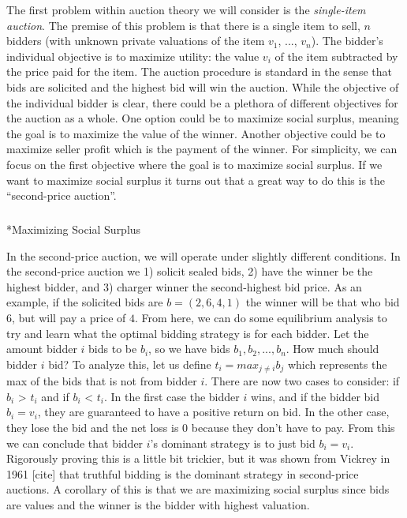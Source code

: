 \documentclass[
  letterpaper,
  numbers=noenddot,
  DIV=11]{scrreprt}
\makeatletter
\let\oldsubparagraph\subparagraph
\renewcommand{\subparagraph}{
    \@ifstar
      \xxxSubParagraphStar
      \xxxSubParagraphNoStar
  }
\newcommand{\xxxSubParagraphStar}[1]{\oldsubparagraph*{#1}\mbox{}}
\newcommand{\xxxSubParagraphNoStar}[1]{\oldsubparagraph{#1}\mbox{}}
\theoremstyle{plain}
\theoremstyle{definition}
\theoremstyle{plain}
\theoremstyle{remark}
\makeatother
\begin{document}
The first problem within auction theory we will consider is the
\emph{single-item auction}. The premise of this problem is that there is
a single item to sell, \(n\) bidders (with unknown private valuations of
the item \(v_1\), ..., \(v_n\)). The bidder's individual objective is to
maximize utility: the value \(v_i\) of the item subtracted by the price
paid for the item. The auction procedure is standard in the sense that
bids are solicited and the highest bid will win the auction. While the
objective of the individual bidder is clear, there could be a plethora
of different objectives for the auction as a whole. One option could be
to maximize social surplus, meaning the goal is to maximize the value of
the winner. Another objective could be to maximize seller profit which
is the payment of the winner. For simplicity, we can focus on the first
objective where the goal is to maximize social surplus. If we want to
maximize social surplus it turns out that a great way to do this is the
``second-price auction''.

\subparagraph*{Maximizing Social
Surplus}\label{maximizing-social-surplus}

In the second-price auction, we will operate under slightly different
conditions. In the second-price auction we 1) solicit sealed bids, 2)
have the winner be the highest bidder, and 3) charger winner the
second-highest bid price. As an example, if the solicited bids are
\(b = (2, 6, 4, 1)\) the winner will be that who bid \(6\), but will pay
a price of \(4\). From here, we can do some equilibrium analysis to try
and learn what the optimal bidding strategy is for each bidder. Let the
amount bidder \(i\) bids to be \(b_i\), so we have bids
\(b_1, b_2, ..., b_n\). How much should bidder \(i\) bid? To analyze
this, let us define \(t_i = max_{j \neq i} b_j\) which represents the
max of the bids that is not from bidder \(i\). There are now two cases
to consider: if \(b_i\) \textgreater{} \(t_i\) and if \(b_i\)
\textless{} \(t_i\). In the first case the bidder \(i\) wins, and if the
bidder bid \(b_i = v_i\), they are guaranteed to have a positive return
on bid. In the other case, they lose the bid and the net loss is 0
because they don't have to pay. From this we can conclude that bidder
\(i\)'s dominant strategy is to just bid \(b_i = v_i\). Rigorously
proving this is a little bit trickier, but it was shown from Vickrey in
1961 {[}cite{]} that truthful bidding is the dominant strategy in
second-price auctions. A corollary of this is that we are maximizing
social surplus since bids are values and the winner is the bidder with
highest valuation.
\end{document}
